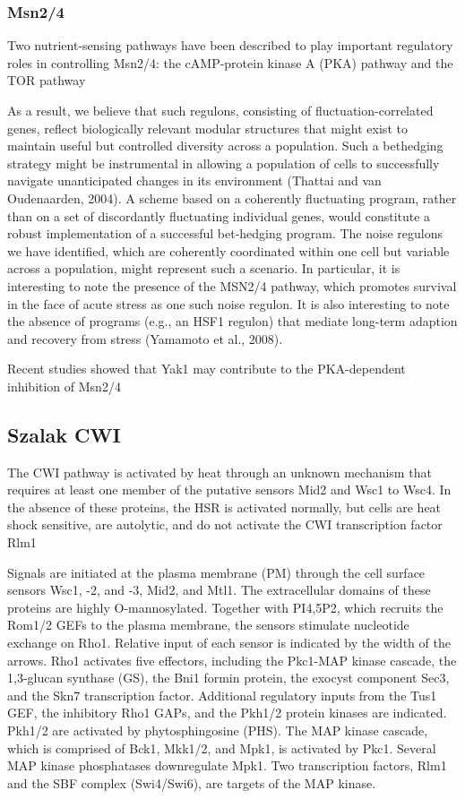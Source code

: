 \documentclass{pracamgr}
\begin{document}
\subsubsection{Msn2/4}
Two nutrient-sensing pathways have
been described to play important regulatory roles in controlling
Msn2/4: the cAMP-protein kinase A (PKA) pathway and the TOR
pathway\cite{Bible}

As a result, we believe that such
regulons, consisting of fluctuation-correlated genes, reflect biologically
relevant modular structures that might exist to maintain
useful but controlled diversity across a population. Such a bethedging
strategy might be instrumental in allowing a population
of cells to successfully navigate unanticipated changes in its
environment (Thattai and van Oudenaarden, 2004). A scheme
based on a coherently fluctuating program, rather than on a
set of discordantly fluctuating individual genes, would constitute
a robust implementation of a successful bet-hedging program.
The noise regulons we have identified, which are coherently
coordinated within one cell but variable across a population,
might represent such a scenario. In particular, it is interesting
to note the presence of the MSN2/4 pathway, which promotes
survival in the face of acute stress as one such noise regulon.
It is also interesting to note the absence of programs (e.g., an
HSF1 regulon) that mediate long-term adaption and recovery
from stress (Yamamoto et al., 2008). \cite{CellularNoice}

Recent studies showed that Yak1 may contribute to the PKA-dependent inhibition of Msn2/4\cite{Bible}

\subsection{Szalak CWI}
The CWI pathway is activated by heat
through an unknown mechanism that requires at least one member of the putative sensors Mid2 and Wsc1 to Wsc4. In the absence
of these proteins, the HSR is activated normally, but cells are heat
shock sensitive, are autolytic, and do not activate the CWI transcription factor Rlm1\cite{Bible}

Signals are initiated at the plasma
membrane (PM) through the cell surface sensors Wsc1, -2, and -3,
Mid2, and Mtl1. The extracellular domains of these proteins are highly
O-mannosylated. Together with PI4,5P2, which recruits the Rom1/2
GEFs to the plasma membrane, the sensors stimulate nucleotide
exchange on Rho1. Relative input of each sensor is indicated by the
width of the arrows. Rho1 activates five effectors, including the 
Pkc1-MAP kinase cascade, the 1,3-glucan synthase (GS), the Bni1 formin
protein, the exocyst component Sec3, and the Skn7 transcription 
factor. Additional regulatory inputs from the Tus1 GEF, the inhibitory
Rho1 GAPs, and the Pkh1/2 protein kinases are indicated. Pkh1/2 are
activated by phytosphingosine (PHS). The MAP kinase cascade, which
is comprised of Bck1, Mkk1/2, and Mpk1, is activated by Pkc1. Several
MAP kinase phosphatases downregulate Mpk1. Two transcription 
factors, Rlm1 and the SBF complex (Swi4/Swi6), are targets of the MAP
kinase.\cite{CWI}
\end{document}
